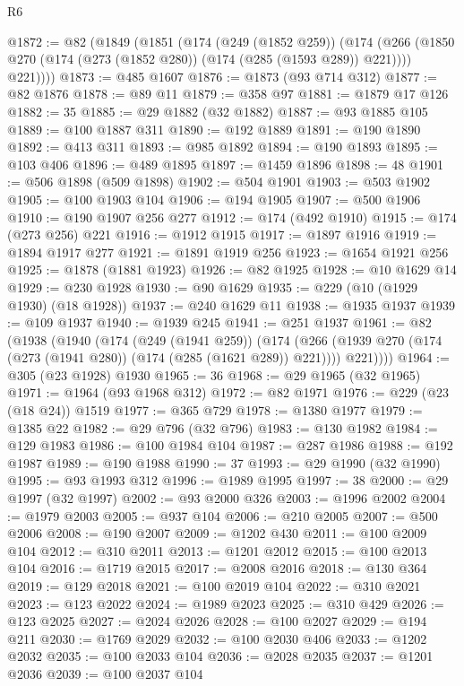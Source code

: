 \begin{lexlean}{R6}
\begin{coremodule}
@1872 := @82
    (@1849
      (@1851
        (@174
          (@249 (@1852 @259))
          (@174
            (@266 (@1850 @270 (@174 (@273 (@1852 @280)) (@174 (@285 (@1593 @289)) @221))))
            @221))))
@1873 := @485 @1607
@1876 := @1873 (@93 @714 @312)
@1877 := @82 @1876
@1878 := @89 @11
@1879 := @358 @97
@1881 := @1879 @17 @126
@1882 := 35
@1885 := @29 @1882 (@32 @1882)
@1887 := @93 @1885 @105
@1889 := @100 @1887 @311
@1890 := @192 @1889
@1891 := @190 @1890
@1892 := @413 @311
@1893 := @985 @1892
@1894 := @190 @1893
@1895 := @103 @406
@1896 := @489 @1895
@1897 := @1459 @1896
@1898 := 48
@1901 := @506 @1898 (@509 @1898)
@1902 := @504 @1901
@1903 := @503 @1902
@1905 := @100 @1903 @104
@1906 := @194 @1905
@1907 := @500 @1906
@1910 := @190 @1907 @256 @277
@1912 := @174 (@492 @1910)
@1915 := @174 (@273 @256) @221
@1916 := @1912 @1915
@1917 := @1897 @1916
@1919 := @1894 @1917 @277
@1921 := @1891 @1919 @256
@1923 := @1654 @1921 @256
@1925 := @1878 (@1881 @1923)
@1926 := @82 @1925
@1928 := @10 @1629 @14
@1929 := @230 @1928
@1930 := @90 @1629
@1935 := @229 (@10 (@1929 @1930) (@18 @1928))
@1937 := @240 @1629 @11
@1938 := @1935 @1937
@1939 := @109 @1937
@1940 := @1939 @245
@1941 := @251 @1937
@1961 := @82
    (@1938
      (@1940
        (@174
          (@249 (@1941 @259))
          (@174
            (@266 (@1939 @270 (@174 (@273 (@1941 @280)) (@174 (@285 (@1621 @289)) @221))))
            @221))))
@1964 := @305 (@23 @1928) @1930
@1965 := 36
@1968 := @29 @1965 (@32 @1965)
@1971 := @1964 (@93 @1968 @312)
@1972 := @82 @1971
@1976 := @229 (@23 (@18 @24)) @1519
@1977 := @365 @729
@1978 := @1380 @1977
@1979 := @1385 @22
@1982 := @29 @796 (@32 @796)
@1983 := @130 @1982
@1984 := @129 @1983
@1986 := @100 @1984 @104
@1987 := @287 @1986
@1988 := @192 @1987
@1989 := @190 @1988
@1990 := 37
@1993 := @29 @1990 (@32 @1990)
@1995 := @93 @1993 @312
@1996 := @1989 @1995
@1997 := 38
@2000 := @29 @1997 (@32 @1997)
@2002 := @93 @2000 @326
@2003 := @1996 @2002
@2004 := @1979 @2003
@2005 := @937 @104
@2006 := @210 @2005
@2007 := @500 @2006
@2008 := @190 @2007
@2009 := @1202 @430
@2011 := @100 @2009 @104
@2012 := @310 @2011
@2013 := @1201 @2012
@2015 := @100 @2013 @104
@2016 := @1719 @2015
@2017 := @2008 @2016
@2018 := @130 @364
@2019 := @129 @2018
@2021 := @100 @2019 @104
@2022 := @310 @2021
@2023 := @123 @2022
@2024 := @1989 @2023
@2025 := @310 @429
@2026 := @123 @2025
@2027 := @2024 @2026
@2028 := @100 @2027
@2029 := @194 @211
@2030 := @1769 @2029
@2032 := @100 @2030 @406
@2033 := @1202 @2032
@2035 := @100 @2033 @104
@2036 := @2028 @2035
@2037 := @1201 @2036
@2039 := @100 @2037 @104

\end{coremodule}
\end{lexlean}
